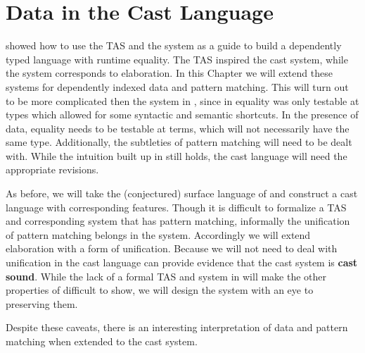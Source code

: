 \chapter{Data in the Cast Language}
\label{chapter:CastData}
\thispagestyle{myheadings}
 
 showed how to use the \ac{TAS} and the \bidir{} system as a guide to build a dependently typed language with runtime equality.
The \ac{TAS} inspired the cast system, while the \bidir{} system corresponds to elaboration.
In this Chapter we will extend these systems for dependently indexed data and pattern matching.
This will turn out to be more complicated then the system in , since in  equality was only testable at types which allowed for some syntactic and semantic shortcuts.
In the presence of data, equality needs to be testable at terms, which will not necessarily have the same type.
Additionally, the subtleties of pattern matching will need to be dealt with.
While the intuition built up in  still holds, the cast language will need the appropriate revisions.
 
As before, we will take the (conjectured) surface language of  and construct a cast language with corresponding features.
Though it is difficult to formalize a \ac{TAS} and corresponding \bidir{} system that has pattern matching, informally the unification of pattern matching belongs in the \bidir{} system.
Accordingly we will extend elaboration with a form of unification.
Because we will not need to deal with unification in the cast language can provide evidence that the cast system is \textbf{cast sound}. 
While the lack of a formal \ac{TAS} and \bidir{} system in  will make the other properties of  difficult to show, we will design the system with an eye to preserving them.
 
 
Despite these caveats, there is an interesting interpretation of data and pattern matching when extended to the cast system.
 
